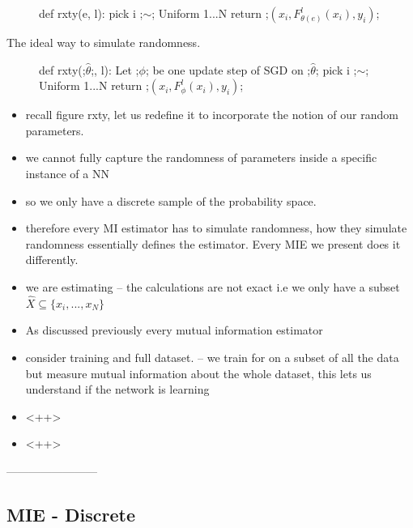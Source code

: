 \documentclass[dissertation.tex]{subfiles}
\begin{document}
\begin{figure}[H]
    \begin{pythonfigure}
      def rxty(e, l):
        pick i ;$\sim$; Uniform {1...N}
        return ;$(x_i, F_{\theta(e)}^l(x_i), y_i)$;
    \end{pythonfigure}
    \caption{
    }
\end{figure}

The ideal way to simulate randomness.

\begin{figure}[H]
    \begin{pythonfigure}
      def rxty(;$\hat\theta$;, l):
        Let ;$\phi$; be one update step of SGD on ;$\hat\theta$;
        pick i ;$\sim$; Uniform {1...N}
        return ;$(x_i, F_\phi^l(x_i), y_i)$;
    \end{pythonfigure}
    \caption{
    }
\end{figure}

\begin{itemize}
  \item{
      recall figure rxty, let us redefine it to incorporate the notion of our
      random parameters.
    }
  \item{
      we cannot fully capture the randomness of parameters inside a specific
      instance of a NN
    }
  \item{
      so we only have a discrete sample of the probability space.
    }
  \item{
      therefore every MI estimator has to simulate randomness, how they simulate
      randomness essentially defines the estimator. Every MIE we present does it
      differently.
    }
  \item{
      we are estimating -- the calculations are not exact i.e we only have a
      subset $\hat{X}\subseteq\{x_i,...,x_N\}$
    }
  \item{
      As discussed previously every mutual information estimator
    }
  \item{
      consider training and full dataset. -- we train for on a subset of all the
      data but measure mutual information about the whole dataset, this lets us
      understand if the network is learning
    }
  \item{
      <++>
    }
  \item{
      <++>
    }
\end{itemize}


------------------------

\subsection{MIE - Discrete} \label{subDiscrete}
\end{document}
